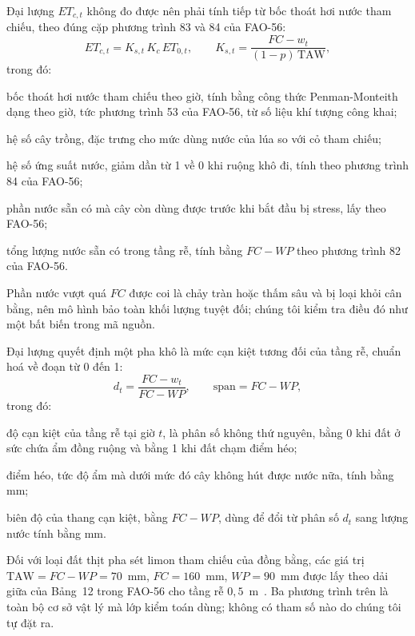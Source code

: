 Đại lượng $ET_{c,t}$ không đo được nên phải tính tiếp từ bốc thoát hơi nước tham
chiếu, theo đúng cặp phương trình 83 và 84 của FAO-56:
\begin{equation}
ET_{c,t}=K_{s,t}\,K_c\,ET_{0,t},
\qquad
K_{s,t}=\frac{FC-w_t}{(1-p)\,\mathrm{TAW}},
\label{eq:etc}
\end{equation}
trong đó:
\begin{symbolist}
\item[$ET_{0,t}$] bốc thoát hơi nước tham chiếu theo giờ, tính bằng công thức
  Penman-Monteith dạng theo giờ, tức phương trình 53 của FAO-56, từ số liệu khí
  tượng công khai;
\item[$K_c$] hệ số cây trồng, đặc trưng cho mức dùng nước của lúa so với cỏ tham
  chiếu;
\item[$K_{s,t}$] hệ số ứng suất nước, giảm dần từ 1 về 0 khi ruộng khô đi, tính
  theo phương trình 84 của FAO-56;
\item[$p$] phần nước sẵn có mà cây còn dùng được trước khi bắt đầu bị stress,
  lấy theo FAO-56;
\item[$\mathrm{TAW}$] tổng lượng nước sẵn có trong tầng rễ, tính bằng
  $FC-WP$ theo phương trình 82 của FAO-56.
\end{symbolist} Phần nước vượt quá $FC$ được coi là chảy tràn hoặc thấm sâu và bị loại khỏi cân
bằng, nên mô hình bảo toàn khối lượng tuyệt đối; chúng tôi kiểm tra điều đó như
một bất biến trong mã nguồn.

Đại lượng quyết định một pha khô là mức cạn kiệt tương đối của tầng rễ, chuẩn hoá
về đoạn từ 0 đến 1:
\begin{equation}
d_t=\frac{FC-w_t}{FC-WP},\qquad \mathrm{span}=FC-WP,
\label{eq:depl}
\end{equation}
trong đó:
\begin{symbolist}
\item[$d_t$] độ cạn kiệt của tầng rễ tại giờ $t$, là phân số không thứ nguyên,
  bằng 0 khi đất ở sức chứa ẩm đồng ruộng và bằng 1 khi đất chạm điểm héo;
\item[$WP$] điểm héo, tức độ ẩm mà dưới mức đó cây không hút được nước nữa,
  tính bằng mm;
\item[$\mathrm{span}$] biên độ của thang cạn kiệt, bằng $FC-WP$, dùng để đổi
  từ phân số $d_t$ sang lượng nước tính bằng mm.
\end{symbolist}

Đối với loại đất thịt pha sét limon tham chiếu của đồng bằng, các giá trị
$\mathrm{TAW}=FC-WP=70$~mm, $FC=160$~mm, $WP=90$~mm được lấy theo dải giữa của
Bảng~12 trong FAO-56 cho tầng rễ $0{,}5$~m~\cite{fao56}. Ba phương trình trên là
toàn bộ cơ sở vật lý mà lớp kiểm toán dùng; không có tham số nào do chúng tôi tự
đặt ra.

